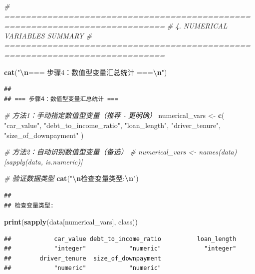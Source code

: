 \documentclass[
]{article}
\newenvironment{Shaded}{\begin{snugshade}}{\end{snugshade}}
\newcommand{\CommentTok}[1]{\textcolor[rgb]{0.56,0.35,0.01}{\textit{#1}}}
\newcommand{\FunctionTok}[1]{\textcolor[rgb]{0.13,0.29,0.53}{\textbf{#1}}}
\newcommand{\NormalTok}[1]{#1}
\newcommand{\OtherTok}[1]{\textcolor[rgb]{0.56,0.35,0.01}{#1}}
\newcommand{\SpecialCharTok}[1]{\textcolor[rgb]{0.81,0.36,0.00}{\textbf{#1}}}
\newcommand{\StringTok}[1]{\textcolor[rgb]{0.31,0.60,0.02}{#1}}
\begin{document}
\begin{Shaded}
\begin{Highlighting}[]
\CommentTok{\# ============================================================================}
\CommentTok{\# 4. NUMERICAL VARIABLES SUMMARY}
\CommentTok{\# ============================================================================}

\FunctionTok{cat}\NormalTok{(}\StringTok{"}\SpecialCharTok{\textbackslash{}n}\StringTok{=== 步骤4：数值型变量汇总统计 ===}\SpecialCharTok{\textbackslash{}n}\StringTok{"}\NormalTok{)}
\end{Highlighting}
\end{Shaded}

\begin{verbatim}
## 
## === 步骤4：数值型变量汇总统计 ===
\end{verbatim}

\begin{Shaded}
\begin{Highlighting}[]
\CommentTok{\# 方法1：手动指定数值型变量（推荐 {-} 更明确）}
\NormalTok{numerical\_vars }\OtherTok{\textless{}{-}} \FunctionTok{c}\NormalTok{(}
  \StringTok{"car\_value"}\NormalTok{, }
  \StringTok{"debt\_to\_income\_ratio"}\NormalTok{, }
  \StringTok{"loan\_length"}\NormalTok{, }
  \StringTok{"driver\_tenure"}\NormalTok{,}
  \StringTok{"size\_of\_downpayment"}
\NormalTok{)}

\CommentTok{\# 方法2：自动识别数值型变量（备选）}
\CommentTok{\# numerical\_vars \textless{}{-} names(data)[sapply(data, is.numeric)]}

\CommentTok{\# 验证数据类型}
\FunctionTok{cat}\NormalTok{(}\StringTok{"}\SpecialCharTok{\textbackslash{}n}\StringTok{检查变量类型:}\SpecialCharTok{\textbackslash{}n}\StringTok{"}\NormalTok{)}
\end{Highlighting}
\end{Shaded}

\begin{verbatim}
## 
## 检查变量类型:
\end{verbatim}

\begin{Shaded}
\begin{Highlighting}[]
\FunctionTok{print}\NormalTok{(}\FunctionTok{sapply}\NormalTok{(data[numerical\_vars], class))}
\end{Highlighting}
\end{Shaded}

\begin{verbatim}
##            car_value debt_to_income_ratio          loan_length 
##            "integer"            "numeric"            "integer" 
##        driver_tenure  size_of_downpayment 
##            "numeric"            "numeric"
\end{verbatim}
\end{document}
